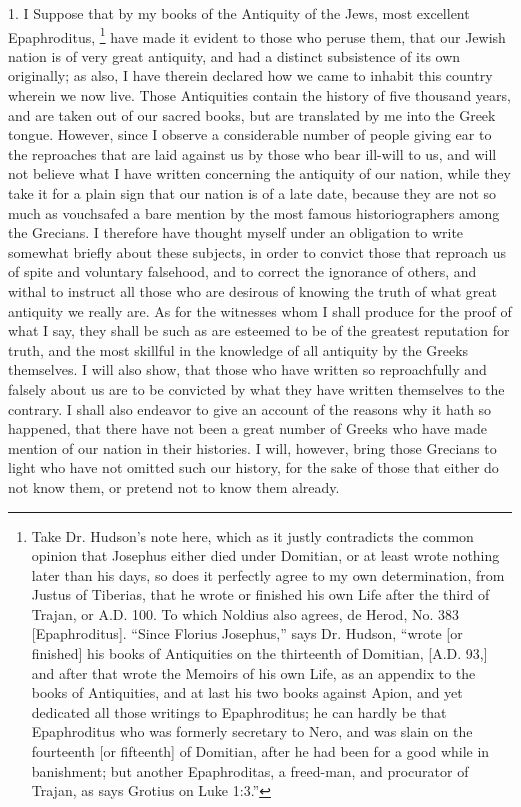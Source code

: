 
1. I Suppose that by my books of the Antiquity of the Jews, most excellent
Epaphroditus, \footnote{Take Dr. Hudson's note
here, which as it justly contradicts the common opinion that Josephus
either died under Domitian, or at least wrote nothing later than his days,
so does it perfectly agree to my own determination, from Justus of
Tiberias, that he wrote or finished his own Life after the third of
Trajan, or A.D. 100. To which Noldius also agrees, de Herod, No. 383
[Epaphroditus]. ``Since Florius Josephus,'' says Dr. Hudson, ``wrote [or
finished] his books of Antiquities on the thirteenth of Domitian, [A.D.
93,] and after that wrote the Memoirs of his own Life, as an appendix to
the books of Antiquities, and at last his two books against Apion, and yet
dedicated all those writings to Epaphroditus; he can hardly be that
Epaphroditus who was formerly secretary to Nero, and was slain on the
fourteenth [or fifteenth] of Domitian, after he had been for a good while
in banishment; but another Epaphroditas, a freed-man, and procurator of
Trajan, as says Grotius on Luke 1:3.''}
have made it evident to those who peruse them, that our Jewish nation is
of very great antiquity, and had a distinct subsistence of its own
originally; as also, I have therein declared how we came to inhabit this
country wherein we now live. Those Antiquities contain the history of five
thousand years, and are taken out of our sacred books, but are translated
by me into the Greek tongue. However, since I observe a considerable
number of people giving ear to the reproaches that are laid against us by
those who bear ill-will to us, and will not believe what I have written
concerning the antiquity of our nation, while they take it for a plain
sign that our nation is of a late date, because they are not so much as
vouchsafed a bare mention by the most famous historiographers among the
Grecians. I therefore have thought myself under an obligation to write
somewhat briefly about these subjects, in order to convict those that
reproach us of spite and voluntary falsehood, and to correct the ignorance
of others, and withal to instruct all those who are desirous of knowing
the truth of what great antiquity we really are. As for the witnesses whom
I shall produce for the proof of what I say, they shall be such as are
esteemed to be of the greatest reputation for truth, and the most skillful
in the knowledge of all antiquity by the Greeks themselves. I will also
show, that those who have written so reproachfully and falsely about us
are to be convicted by what they have written themselves to the contrary.
I shall also endeavor to give an account of the reasons why it hath so
happened, that there have not been a great number of Greeks who have made
mention of our nation in their histories. I will, however, bring those
Grecians to light who have not omitted such our history, for the sake of
those that either do not know them, or pretend not to know them already.

